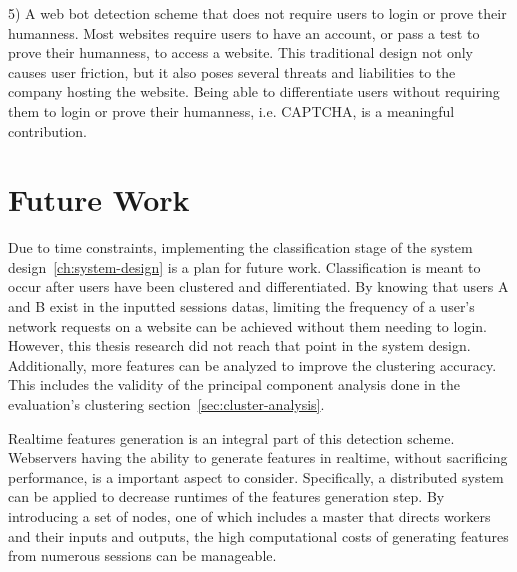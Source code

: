 5) A web bot detection scheme that does not require users to login or prove their humanness.
Most websites require users to have an account, or pass a test to prove their humanness, to access a website.
This traditional design not only causes user friction, but it also poses several threats and liabilities to the company hosting the website.
Being able to differentiate users without requiring them to login or prove their humanness, i.e. CAPTCHA, is a meaningful contribution.

\section{Future Work}\label{sec:future-work}
Due to time constraints, implementing the classification stage of the system design~\ref{ch:system-design} is a plan for future work.
Classification is meant to occur after users have been clustered and differentiated.
By knowing that users A and B exist in the inputted sessions datas, limiting the frequency of a user's network requests on a website can be achieved without them needing to login.
However, this thesis research did not reach that point in the system design.
Additionally, more features can be analyzed to improve the clustering accuracy.
This includes the validity of the principal component analysis done in the evaluation's clustering section~\ref{sec:cluster-analysis}.

Realtime features generation is an integral part of this detection scheme.
Webservers having the ability to generate features in realtime, without sacrificing performance, is a important aspect to consider.
Specifically, a distributed system can be applied to decrease runtimes of the features generation step.
By introducing a set of nodes, one of which includes a master that directs workers and their inputs and outputs, the high computational costs of generating features from numerous sessions can be manageable.

